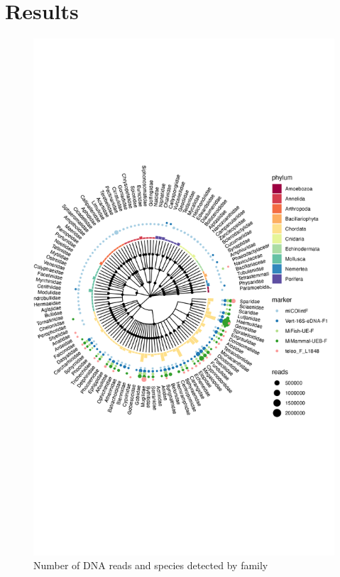 \documentclass[10pt]{article}
\begin{document}
\section{Results}






\begin{figure}[h!]
\centering
\includegraphics[width=\textwidth]{tree}
\caption{Number of DNA reads and species detected by family}
\end{figure}
\end{document}
